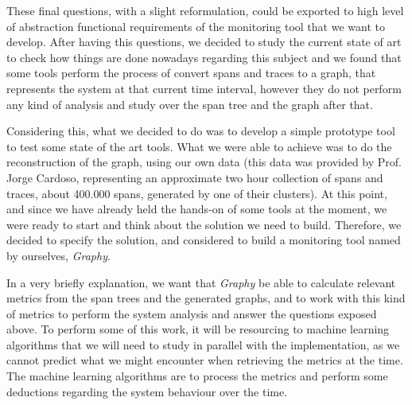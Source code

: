  These final questions, with a slight reformulation, could be exported to high level of abstraction functional requirements of the monitoring tool that we want to develop. After having this questions, we decided to study the current state of art to check how things are done nowadays regarding this subject and we found that some tools perform the process of convert spans and traces to a graph, that represents the system at that current time interval, however they do not perform any kind of analysis and study over the span tree and the graph after that\cite{spans_analysis}.
 
 Considering this, what we decided to do was to develop a simple prototype tool to test some state of the art tools. What we were able to achieve was to do the reconstruction of the graph, using our own data (this data was provided by Prof. Jorge Cardoso, representing an approximate two hour collection of spans and traces, about 400.000 spans, generated by one of their clusters). At this point, and since we have already held the hands-on of some tools at the moment, we were ready to start and think about the solution we need to build. Therefore, we decided to specify the solution, and considered to build a monitoring tool named by ourselves, \textit{Graphy}.
 
 In a very briefly explanation, we want that \textit{Graphy} be able to calculate relevant metrics from the span trees and the generated graphs, and to work with this kind of metrics to perform the system analysis and answer the questions exposed above. To perform some of this work, it will be resourcing to machine learning algorithms that we will need to study in parallel with the implementation, as we cannot predict what we might encounter when retrieving the metrics at the time. The machine learning algorithms are to process the metrics and perform some deductions regarding the system behaviour over the time.


\checkoddpage
{}
{ %
\newpage
\blankpage}
{ %
}
